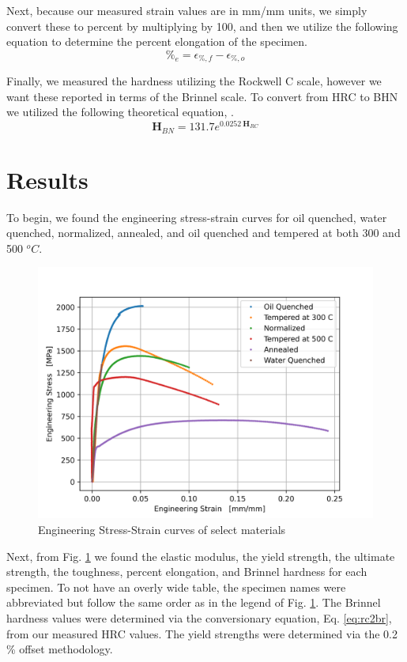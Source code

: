 \documentclass{article}
\begin{document}
Next, because our measured strain values are in mm/mm units, we simply convert these to percent by multiplying by 100, and then we utilize the following equation to determine the percent elongation of the specimen.
\begin{equation}
    \%_{e} = \epsilon_{\%,f} -\epsilon_{\%,o}
\end{equation}

Finally, we measured the hardness utilizing the Rockwell C scale, however we want these reported in terms of the Brinnel scale. To convert from HRC to BHN we utilized the following theoretical equation, \cite{manual}.
\begin{equation}
    \textbf{H}_{BN} = 131.7 e^{0.0252\:\textbf{H}_{RC}}
    \label{eq:rc2br}
\end{equation}

\newpage
\section{Results}
To begin, we found the engineering stress-strain curves for oil quenched, water quenched, normalized, annealed, and oil quenched and tempered at both 300 and 500 $^oC$. 

\begin{figure}[!h!]
    \centering
    \includegraphics[width=0.5\linewidth]{plots/q1_adjusted.png}
    \caption{Engineering Stress-Strain curves of select materials}
    \label{fig:q1-all}
\end{figure}

Next, from Fig. \ref{fig:q1-all} we found the elastic modulus, the yield strength, the ultimate strength, the toughness, percent elongation, and Brinnel hardness for each specimen. To not have an overly wide table, the specimen names were abbreviated but follow the same order as in the legend of Fig. \ref{fig:q1-all}. The Brinnel hardness values were determined via the conversionary equation, Eq. \ref{eq:rc2br}, from our measured HRC values. The yield strengths were determined via the 0.2 \% offset methodology.
\end{document}
